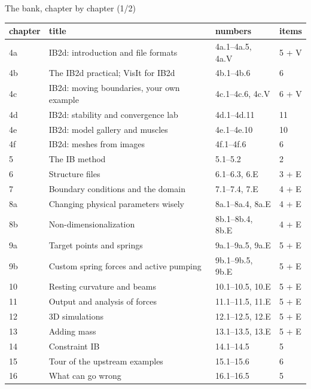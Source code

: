 \documentclass[aspectratio=169,11pt]{beamer}
\begin{document}
\begin{frame}{The bank, chapter by chapter (1/2)}
\label{fr:index1}
\scriptsize
\renewcommand{\arraystretch}{1.0}
\begin{tabular}{@{}L{0.08\textwidth}L{0.55\textwidth}L{0.2\textwidth}L{0.08\textwidth}@{}}
\toprule
chapter & title & numbers & items\\
\midrule
4a & IB2d: introduction and file formats & 4a.1--4a.5, 4a.V & 5 + V\\
4b & The IB2d practical; VisIt for IB2d & 4b.1--4b.6 & 6\\
4c & IB2d: moving boundaries, your own example & 4c.1--4c.6, 4c.V & 6 + V\\
4d & IB2d: stability and convergence lab & 4d.1--4d.11 & 11\\
4e & IB2d: model gallery and muscles & 4e.1--4e.10 & 10\\
4f & IB2d: meshes from images & 4f.1--4f.6 & 6\\
5 & The IB method & 5.1--5.2 & 2\\
6 & Structure files & 6.1--6.3, 6.E & 3 + E\\
7 & Boundary conditions and the domain & 7.1--7.4, 7.E & 4 + E\\
8a & Changing physical parameters wisely & 8a.1--8a.4, 8a.E & 4 + E\\
8b & Non-dimensionalization & 8b.1--8b.4, 8b.E & 4 + E\\
9a & Target points and springs & 9a.1--9a.5, 9a.E & 5 + E\\
9b & Custom spring forces and active pumping & 9b.1--9b.5, 9b.E & 5 + E\\
10 & Resting curvature and beams & 10.1--10.5, 10.E & 5 + E\\
11 & Output and analysis of forces & 11.1--11.5, 11.E & 5 + E\\
12 & 3D simulations & 12.1--12.5, 12.E & 5 + E\\
13 & Adding mass & 13.1--13.5, 13.E & 5 + E\\
14 & Constraint IB & 14.1--14.5 & 5\\
15 & Tour of the upstream examples & 15.1--15.6 & 6\\
16 & What can go wrong & 16.1--16.5 & 5\\
\bottomrule
\end{tabular}
\end{frame}
\end{document}
